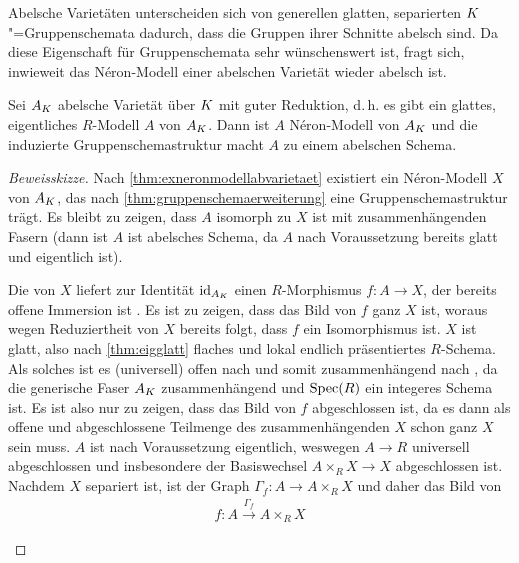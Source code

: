 Abelsche Varietäten unterscheiden sich von generellen glatten,
separierten $K$"=Gruppenschemata dadurch, dass die Gruppen ihrer
Schnitte abelsch sind. Da diese Eigenschaft für Gruppenschemata
sehr wünschenswert ist, fragt sich, inwieweit das Néron-Modell einer
abelschen Varietät wieder abelsch ist.
\begin{Satz}
  \label{thm:abelscheneronmodelle}
  Sei $A_{K}$ abelsche Varietät über $K$ mit guter Reduktion,
  d.\,h. es gibt ein glattes, eigentliches $R$-Modell $A$ von $A_{K}$.
  Dann ist $A$ Néron-Modell von $A_{K}$ und die induzierte
  Gruppenschemastruktur macht $A$ zu einem abelschen Schema.
  \begin{proof}[Beweisskizze]
    Nach \ref{thm:exneronmodellabvarietaet} existiert ein
    Néron-Modell $X$ von $A_{K}$, das nach
    \ref{thm:gruppenschemaerweiterung} eine Gruppenschemastruktur
    trägt.
    Es bleibt zu zeigen, dass $A$ isomorph zu $X$ ist
    mit zusammenhängenden Fasern (dann ist $A$ ist abelsches Schema,
    da $A$ nach Voraussetzung bereits glatt und eigentlich ist).
    \begin{description}[font=\normalfont\itshape]
    \item[$A$ isomorph zu $X$:]
      Die \NAbbEig von $X$ liefert zur Identität $\mathrm{id}_{A_{K}}$ einen
      $R$-Morphismus $f\colon A\to X$, der bereits offene Immersion ist
      \cite[s.][4.3/1~(ii) oder 4.4/1]{neron}.
      Es ist zu zeigen, dass das Bild von $f$ ganz $X$ ist, woraus
      wegen Reduziertheit von $X$ bereits folgt, dass $f$ ein
      Isomorphismus ist.
      $X$ ist glatt, also nach
      \ref{thm:eigglatt} flaches und lokal endlich präsentiertes
      $R$-Schema.
      Als solches ist es (universell) offen nach
      \cite[Theorem 14.33]{wedhorn} und somit zusammenhängend nach
      \cite[Proposition 3.24]{wedhorn},
      da die generische Faser $A_{K}$ zusammenhängend und $\operatorname{Spec}(R)$
      ein integeres Schema ist.
      Es ist also nur zu zeigen, dass das Bild von $f$ abgeschlossen
      ist, da es dann als offene und abgeschlossene Teilmenge des
      zusammenhängenden $X$ schon ganz $X$ sein muss.
      $A$ ist nach Voraussetzung eigentlich, weswegen $A\to R$
      universell abgeschlossen und insbesondere der Basiswechsel
      $A\times_R X\to X$ abgeschlossen ist.
      Nachdem $X$ separiert ist, ist der Graph
      $\Gamma_f\colon A\to A\times_R X$ und daher das Bild von
      \begin{gather*}
        f\colon A\xrightarrow{\Gamma_f} A\times_R X

\end{gather*}
\end{description}
\end{proof}
\end{Satz}

